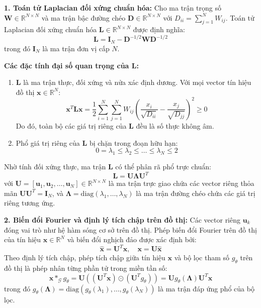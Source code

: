 \textbf{1. Toán tử Laplacian đối xứng chuẩn hóa:}
Cho ma trận trọng số $\mathbf{W} \in \mathbb{R}^{N \times N}$ và ma trận bậc đường chéo $\mathbf{D} \in \mathbb{R}^{N \times N}$ với $D_{ii} = \sum_{j=1}^N W_{ij}$. Toán tử Laplacian đối xứng chuẩn hóa $\mathbf{L} \in \mathbb{R}^{N \times N}$ được định nghĩa:
\begin{equation}
    \mathbf{L} = \mathbf{I}_N - \mathbf{D}^{-1/2} \mathbf{W} \mathbf{D}^{-1/2}
\end{equation}
trong đó $\mathbf{I}_N$ là ma trận đơn vị cấp $N$.

\textbf{Các đặc tính đại số quan trọng của $\mathbf{L}$:}
\begin{enumerate}
    \item $\mathbf{L}$ là ma trận thực, đối xứng và nửa xác định dương. Với mọi vector tín hiệu đồ thị $\mathbf{x} \in \mathbb{R}^N$:
    \begin{equation}
        \mathbf{x}^T \mathbf{L} \mathbf{x} = \frac{1}{2} \sum_{i=1}^N \sum_{j=1}^N W_{ij} \left( \frac{x_i}{\sqrt{D_{ii}}} - \frac{x_j}{\sqrt{D_{jj}}} \right)^2 \ge 0
    \end{equation}
    Do đó, toàn bộ các giá trị riêng của $\mathbf{L}$ đều là số thực không âm.
    \item Phổ giá trị riêng của $\mathbf{L}$ bị chặn trong đoạn hữu hạn:
    \begin{equation}
        0 = \lambda_1 \le \lambda_2 \le \dots \le \lambda_N \le 2
    \end{equation}
\end{enumerate}

Nhờ tính đối xứng thực, ma trận $\mathbf{L}$ có thể phân rã phổ trực chuẩn:
\begin{equation}
    \mathbf{L} = \mathbf{U} \boldsymbol{\Lambda} \mathbf{U}^T
\end{equation}
với $\mathbf{U} = [\mathbf{u}_1, \mathbf{u}_2, \dots, \mathbf{u}_N] \in \mathbb{R}^{N \times N}$ là ma trận trực giao chứa các vector riêng thỏa mãn $\mathbf{U} \mathbf{U}^T = \mathbf{I}_N$, và $\boldsymbol{\Lambda} = \text{diag}(\lambda_1, \dots, \lambda_N)$ là ma trận đường chéo chứa các giá trị riêng tương ứng.

\textbf{2. Biến đổi Fourier và định lý tích chập trên đồ thị:}
Các vector riêng $\mathbf{u}_k$ đóng vai trò như hệ hàm sóng cơ sở trên đồ thị. Phép biến đổi Fourier trên đồ thị của tín hiệu $\mathbf{x} \in \mathbb{R}^N$ và biến đổi nghịch đảo được xác định bởi:
\begin{equation}
    \hat{\mathbf{x}} = \mathbf{U}^T \mathbf{x}, \quad \mathbf{x} = \mathbf{U} \hat{\mathbf{x}}
\end{equation}
Theo định lý tích chập, phép tích chập giữa tín hiệu $\mathbf{x}$ và bộ lọc tham số $g_\theta$ trên đồ thị là phép nhân từng phần tử trong miền tần số:
\begin{equation}
    \mathbf{x} \ast_{\mathcal{G}} g_\theta = \mathbf{U} \left( (\mathbf{U}^T \mathbf{x}) \odot (\mathbf{U}^T g_\theta) \right) = \mathbf{U} g_\theta(\boldsymbol{\Lambda}) \mathbf{U}^T \mathbf{x}
\end{equation}
trong đó $g_\theta(\boldsymbol{\Lambda}) = \text{diag}(g_\theta(\lambda_1), \dots, g_\theta(\lambda_N))$ là ma trận đáp ứng phổ của bộ lọc.

